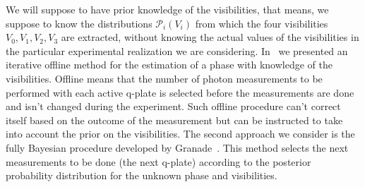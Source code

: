 \documentclass[aps, pra, 10pt, twocolumn, superscriptaddress,floatfix]{revtex4-1}
\begin{document}
We will suppose to have prior knowledge of the visibilities, that means, we suppose to know the distributions $\mathcal{P}_i (V_i)$ from which the four visibilities $V_0, V_1, V_2, V_3$ are extracted, without knowing the actual values of the visibilities in the particular experimental realization we are considering. In~\cite{Cimini2021} we presented an iterative offline method for the estimation of a phase with knowledge of the visibilities. Offline means that the number of photon measurements to be performed with each active q-plate is selected before the measurements are done and isn't changed during the experiment. Such offline procedure can't correct itself based on the outcome of the measurement but can be instructed to take into account the prior on the visibilities. The second approach we consider is the fully Bayesian procedure developed by Granade~\cite{Granade2012}. This method selects the next measurements to be done (the next q-plate) according to the posterior probability distribution for the unknown phase and visibilities.
\end{document}
